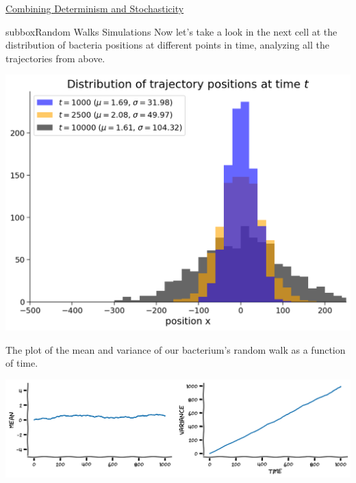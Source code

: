 \begin{textbox}{\href{https://compneuro.neuromatch.io/tutorials/W2D2_LinearSystems/student/W2D2_Tutorial3.html}{Combining Determinism and Stochasticity } }
\begin{subbox}{subbox}{Random Walks Simulations}
Now let's take a look in the next cell at the distribution of bacteria positions at different points in time, analyzing all the trajectories from above.
\begin{center}
\includegraphics[scale=0.25]{Figures/LS/CDS_Figure4.png}
\end{center}
The plot of the mean and variance of our bacterium's random walk as a function of time.

\begin{center}
\includegraphics[scale=0.25]{Figures/LS/CDS_Figure5.png}
\end{center}
\end{subbox}
\end{textbox}

